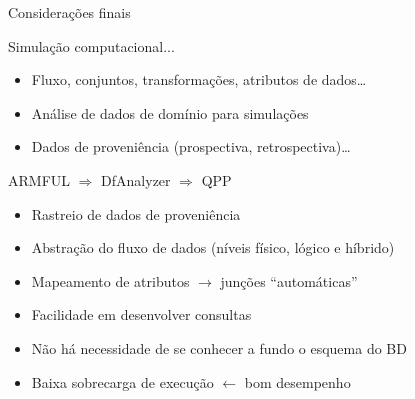 \documentclass[12pt,compress,final]{beamer}
\newcommand{\nologo}{\setbeamertemplate{logo}{}} %
\begin{document}
{\nologo
\begin{frame}[t,squeeze]{Considerações finais}

\footnotesize


\begin{block}{Simulação computacional...}
\begin{itemize}
\item Fluxo, conjuntos, transformações, atributos de dados\ldots{}
\item Análise de dados de domínio para simulações
\item Dados de proveniência (prospectiva, retrospectiva)\ldots{}
\end{itemize}
\end{block}

\vfill

\begin{alertblock}{ARMFUL $\Rightarrow$ DfAnalyzer $\Rightarrow$ QPP}
\begin{itemize}
\item \alert{Rastreio} de dados de proveniência
\item \alert{Abstração} do fluxo de dados (níveis físico, lógico e híbrido)
\item Mapeamento de atributos $\rightarrow$ \alert{junções ``automáticas''}
\item \alert{Facilidade} em desenvolver consultas
\item Não há necessidade de se conhecer a fundo o esquema do BD
\item Baixa sobrecarga de execução $\leftarrow$ bom desempenho
\end{itemize}
\end{alertblock}

\end{frame}
}

\end{document}
